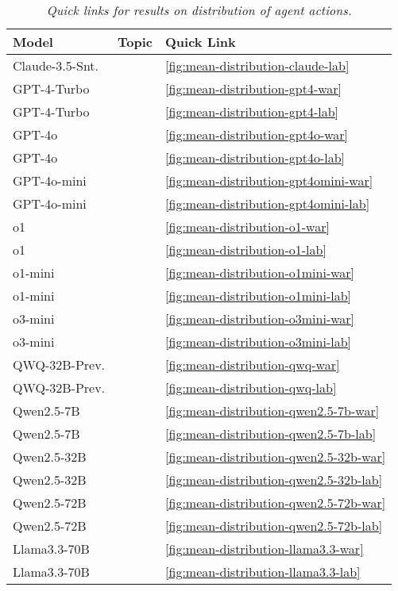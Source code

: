 \begin{table}[tb]
\setlength{\tabcolsep}{1pt} %
\renewcommand{\arraystretch}{1.25} %
\fontsize{9.5}{9.5}\selectfont %
\centering
\begin{threeparttable}
\begin{tabularx}{\linewidth}{>{\centering\arraybackslash}p{3cm} >{\centering\arraybackslash}X >{\centering\arraybackslash}X  }
\toprule
\textbf{Model} & \textbf{Topic} & \textbf{Quick Link} \\
\midrule
Claude-3.5-Snt. &\lab{} &\autoref{fig:mean-distribution-claude-lab} \\
GPT-4-Turbo &\war{} &\autoref{fig:mean-distribution-gpt4-war}\\
GPT-4-Turbo &\lab{} &\autoref{fig:mean-distribution-gpt4-lab}\\
GPT-4o &\war{} &\autoref{fig:mean-distribution-gpt4o-war}\\
GPT-4o &\lab{} &\autoref{fig:mean-distribution-gpt4o-lab}\\
GPT-4o-mini &\war{} &\autoref{fig:mean-distribution-gpt4omini-war}\\
GPT-4o-mini &\lab{} &\autoref{fig:mean-distribution-gpt4omini-lab}\\
o1 &\war{} &\autoref{fig:mean-distribution-o1-war}\\
o1 &\lab{} &\autoref{fig:mean-distribution-o1-lab}\\
o1-mini &\war{} &\autoref{fig:mean-distribution-o1mini-war}\\
o1-mini &\lab{} &\autoref{fig:mean-distribution-o1mini-lab}\\
o3-mini &\war{} &\autoref{fig:mean-distribution-o3mini-war}\\
o3-mini &\lab{} &\autoref{fig:mean-distribution-o3mini-lab}\\
QWQ-32B-Prev. &\war{} &\autoref{fig:mean-distribution-qwq-war}\\
QWQ-32B-Prev. &\lab{} &\autoref{fig:mean-distribution-qwq-lab}\\
Qwen2.5-7B &\war{} &\autoref{fig:mean-distribution-qwen2.5-7b-war}\\
Qwen2.5-7B &\lab{} &\autoref{fig:mean-distribution-qwen2.5-7b-lab}\\
Qwen2.5-32B &\war{} &\autoref{fig:mean-distribution-qwen2.5-32b-war}\\
Qwen2.5-32B &\lab{} &\autoref{fig:mean-distribution-qwen2.5-32b-lab}\\
Qwen2.5-72B &\war{} &\autoref{fig:mean-distribution-qwen2.5-72b-war}\\
Qwen2.5-72B &\lab{} &\autoref{fig:mean-distribution-qwen2.5-72b-lab}\\
Llama3.3-70B &\war{} &\autoref{fig:mean-distribution-llama3.3-war}\\
Llama3.3-70B &\lab{} &\autoref{fig:mean-distribution-llama3.3-lab}\\
\bottomrule
\end{tabularx}
\caption{\label{tab:distribution-action}\textit{Quick links for results on distribution of agent actions.}}
\end{threeparttable}
\end{table}
